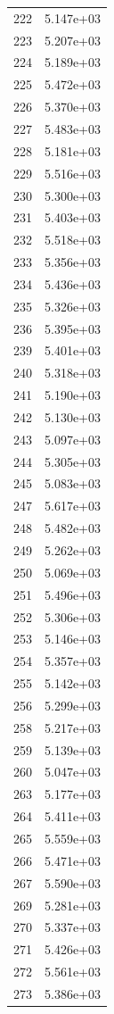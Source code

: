 \documentclass[12pt]{article}
\begin{document}
\begin{longtable}{@{}cc@{}}
222 & 5.147e+03 \\
223 & 5.207e+03 \\
224 & 5.189e+03 \\
225 & 5.472e+03 \\
226 & 5.370e+03 \\
227 & 5.483e+03 \\
228 & 5.181e+03 \\
229 & 5.516e+03 \\
230 & 5.300e+03 \\
231 & 5.403e+03 \\
232 & 5.518e+03 \\
233 & 5.356e+03 \\
234 & 5.436e+03 \\
235 & 5.326e+03 \\
236 & 5.395e+03 \\
239 & 5.401e+03 \\
240 & 5.318e+03 \\
241 & 5.190e+03 \\
242 & 5.130e+03 \\
243 & 5.097e+03 \\
244 & 5.305e+03 \\
245 & 5.083e+03 \\
247 & 5.617e+03 \\
248 & 5.482e+03 \\
249 & 5.262e+03 \\
250 & 5.069e+03 \\
251 & 5.496e+03 \\
252 & 5.306e+03 \\
253 & 5.146e+03 \\
254 & 5.357e+03 \\
255 & 5.142e+03 \\
256 & 5.299e+03 \\
258 & 5.217e+03 \\
259 & 5.139e+03 \\
260 & 5.047e+03 \\
263 & 5.177e+03 \\
264 & 5.411e+03 \\
265 & 5.559e+03 \\
266 & 5.471e+03 \\
267 & 5.590e+03 \\
269 & 5.281e+03 \\
270 & 5.337e+03 \\
271 & 5.426e+03 \\
272 & 5.561e+03 \\
273 & 5.386e+03 \\

\end{longtable}
\end{document}
